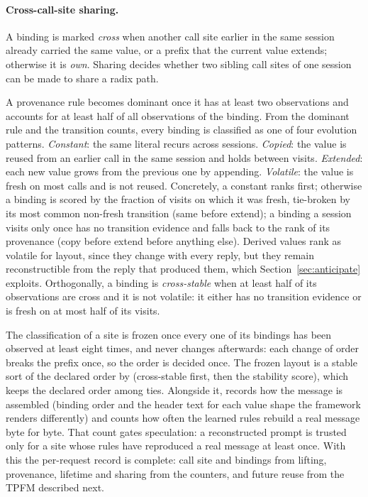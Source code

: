 \paragraph{Cross-call-site sharing.} A binding is marked \emph{cross} when another call site earlier in the same session already carried the same value, or a prefix that the current value extends; otherwise it is \emph{own}. Sharing decides whether two sibling call sites of one session can be made to share a radix path.

A provenance rule becomes dominant once it has at least two observations and accounts for at least half of all observations of the binding. From the dominant rule and the transition counts, every binding is classified as one of four evolution patterns. \emph{Constant}: the same literal recurs across sessions. \emph{Copied}: the value is reused from an earlier call in the same session and holds between visits. \emph{Extended}: each new value grows from the previous one by appending. \emph{Volatile}: the value is fresh on most calls and is not reused. Concretely, a constant ranks first; otherwise a binding is scored by the fraction of visits on which it was fresh, tie-broken by its most common non-fresh transition (same before extend); a binding a session visits only once has no transition evidence and falls back to the rank of its provenance (copy before extend before anything else). Derived values rank as volatile for layout, since they change with every reply, but they remain reconstructible from the reply that produced them, which Section~\ref{sec:anticipate} exploits. Orthogonally, a binding is \emph{cross-stable} when at least half of its observations are cross and it is not volatile: it either has no transition evidence or is fresh on at most half of its visits.

The classification of a site is frozen once every one of its bindings has been observed at least eight times, and never changes afterwards: each change of order breaks the prefix once, so the order is decided once. The frozen layout is a stable sort of the declared order by (cross-stable first, then the stability score), which keeps the declared order among ties. Alongside it, \sysname records how the message is assembled (binding order and the header text for each value shape the framework renders differently) and counts how often the learned rules rebuild a real message byte for byte. That count gates speculation: a reconstructed prompt is trusted only for a site whose rules have reproduced a real message at least once. With this the per-request record is complete: call site and bindings from lifting, provenance, lifetime and sharing from the counters, and future reuse from the TPFM described next.

